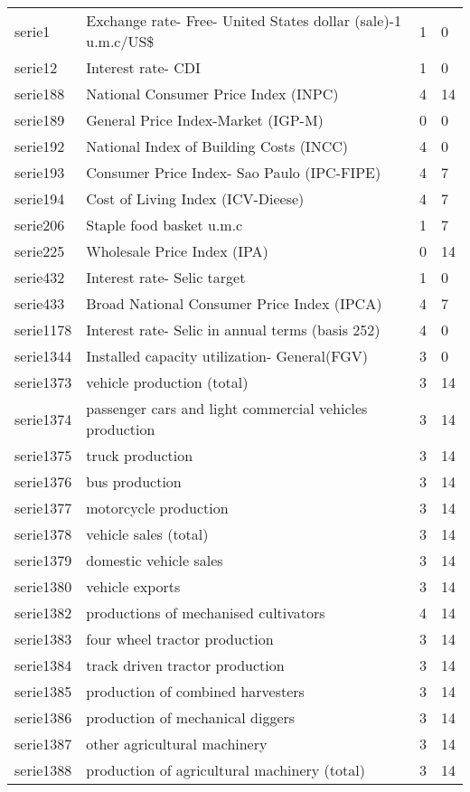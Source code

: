 \documentclass{article}
\begin{document}
\begin{landscape}
\begin{center}
\begin{longtable}{|l|l|l|l|}
serie1 & Exchange rate- Free- United States dollar (sale)-1 u.m.c/US\$ & 1 & 0 \\
serie12 & Interest rate- CDI & 1 & 0 \\
serie188 & National Consumer Price Index (INPC) & 4 & 14 \\
serie189 & General Price Index-Market (IGP-M) & 0 & 0 \\
serie192 & National Index of Building Costs (INCC) & 4 & 0 \\
serie193 & Consumer Price Index- Sao Paulo (IPC-FIPE) & 4 & 7 \\
serie194 & Cost of Living Index (ICV-Dieese) & 4 & 7 \\
serie206 & Staple food basket u.m.c & 1 & 7 \\
serie225 & Wholesale Price Index (IPA) & 0 & 14 \\
serie432 & Interest rate- Selic target & 1 & 0 \\
serie433 & Broad National Consumer Price Index (IPCA) & 4 & 7 \\
serie1178 & Interest rate- Selic in annual terms (basis 252) & 4 & 0 \\
serie1344 & Installed capacity utilization- General(FGV) & 3 & 0 \\
serie1373 & vehicle production (total) & 3 & 14 \\
serie1374 & passenger cars and light commercial vehicles production & 3 & 14 \\
serie1375 & truck production & 3 & 14 \\
serie1376 & bus production & 3 & 14 \\
serie1377 & motorcycle production & 3 & 14 \\
serie1378 & vehicle sales (total) & 3 & 14 \\
serie1379 & domestic vehicle sales & 3 & 14 \\
serie1380 & vehicle exports & 3 & 14 \\
serie1382 & productions of mechanised cultivators & 4 & 14 \\
serie1383 & four wheel tractor production & 3 & 14 \\
serie1384 & track driven tractor production & 3 & 14 \\
serie1385 & production of combined harvesters & 3 & 14 \\
serie1386 & production of mechanical diggers & 3 & 14 \\
serie1387 & other agricultural machinery & 3 & 14 \\
serie1388 & production of agricultural machinery (total) & 3 & 14 \\

\end{longtable}
\end{center}
\end{landscape}
\end{document}
